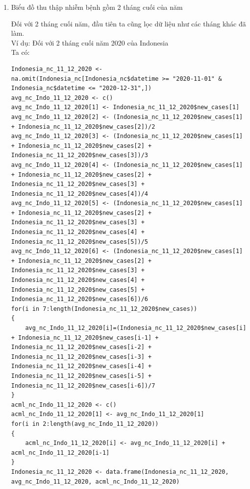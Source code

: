 \documentclass[a4paper]{article}
\theoremstyle{definition}
\begin{document}
\begin{enumerate}[1)]
    \item Biểu đồ thu thập nhiễm bệnh gồm 2 tháng cuối của năm
    
	Đối với 2 tháng cuối năm, đầu tiên ta cũng lọc dữ liệu như các tháng khác đã làm.\\[8pt]
	Ví dụ: Đối với 2 tháng cuối năm 2020 của Indonesia\\
	Ta có:
	\begin{lstlisting}
Indonesia_nc_11_12_2020 <- na.omit(Indonesia_nc[Indonesia_nc$datetime >= "2020-11-01" & Indonesia_nc$datetime <= "2020-12-31",])
avg_nc_Indo_11_12_2020 <- c()
avg_nc_Indo_11_12_2020[1] <- Indonesia_nc_11_12_2020$new_cases[1]
avg_nc_Indo_11_12_2020[2] <- (Indonesia_nc_11_12_2020$new_cases[1] + Indonesia_nc_11_12_2020$new_cases[2])/2
avg_nc_Indo_11_12_2020[3] <- (Indonesia_nc_11_12_2020$new_cases[1] + Indonesia_nc_11_12_2020$new_cases[2] + Indonesia_nc_11_12_2020$new_cases[3])/3
avg_nc_Indo_11_12_2020[4] <- (Indonesia_nc_11_12_2020$new_cases[1] + Indonesia_nc_11_12_2020$new_cases[2] + Indonesia_nc_11_12_2020$new_cases[3] + Indonesia_nc_11_12_2020$new_cases[4])/4
avg_nc_Indo_11_12_2020[5] <- (Indonesia_nc_11_12_2020$new_cases[1] + Indonesia_nc_11_12_2020$new_cases[2] + Indonesia_nc_11_12_2020$new_cases[3] + Indonesia_nc_11_12_2020$new_cases[4] + Indonesia_nc_11_12_2020$new_cases[5])/5
avg_nc_Indo_11_12_2020[6] <- (Indonesia_nc_11_12_2020$new_cases[1] + Indonesia_nc_11_12_2020$new_cases[2] + Indonesia_nc_11_12_2020$new_cases[3] + Indonesia_nc_11_12_2020$new_cases[4] + Indonesia_nc_11_12_2020$new_cases[5] + Indonesia_nc_11_12_2020$new_cases[6])/6
for(i in 7:length(Indonesia_nc_11_12_2020$new_cases))
{
    avg_nc_Indo_11_12_2020[i]=(Indonesia_nc_11_12_2020$new_cases[i] + Indonesia_nc_11_12_2020$new_cases[i-1] + Indonesia_nc_11_12_2020$new_cases[i-2] + Indonesia_nc_11_12_2020$new_cases[i-3] + Indonesia_nc_11_12_2020$new_cases[i-4] + Indonesia_nc_11_12_2020$new_cases[i-5] + Indonesia_nc_11_12_2020$new_cases[i-6])/7
}
acml_nc_Indo_11_12_2020 <- c()
acml_nc_Indo_11_12_2020[1] <- avg_nc_Indo_11_12_2020[1]
for(i in 2:length(avg_nc_Indo_11_12_2020))
{
	acml_nc_Indo_11_12_2020[i] <- avg_nc_Indo_11_12_2020[i] + acml_nc_Indo_11_12_2020[i-1]
}
Indonesia_nc_11_12_2020 <- data.frame(Indonesia_nc_11_12_2020, avg_nc_Indo_11_12_2020, acml_nc_Indo_11_12_2020)
	\end{lstlisting}
	

\end{enumerate}
\end{document}

